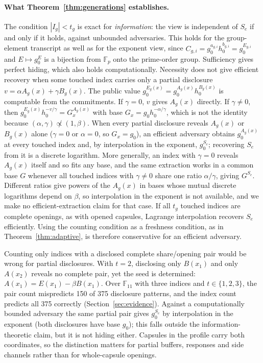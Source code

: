 \documentclass[pdflatex,sn-mathphys-num]{sn-jnl}%
\theoremstyle{plain}
\theoremstyle{definition}
\newcommand{\F}{\mathbb{F}}
\begin{document}
\paragraph{What Theorem~\ref{thm:generations} establishes.}
The condition $|I_g|<t_g$ is exact for \emph{information}: the view is independent of $S_e$ if and only if it holds, against unbounded adversaries. This holds for the group-element transcript as well as for the exponent view, since $C_{g,i}=g_0^{a_{g,i}}h_0^{b_{g,i}}=g_0^{E_{g,i}}$ and $E\mapsto g_0^E$ is a bijection from $\F_p$ onto the prime-order group. Sufficiency gives perfect hiding, which also holds computationally. Necessity does not give efficient recovery when some touched index carries only a partial disclosure $v=\alpha A_g(x)+\gamma B_g(x)$. The public value $g_0^{E_g(x)}=g_0^{A_g(x)}h_0^{B_g(x)}$ is computable from the commitments. If $\gamma=0$, $v$ gives $A_g(x)$ directly. If $\gamma\ne0$, then $g_0^{E_g(x)}h_0^{-v/\gamma}=G_x^{A_g(x)}$ with base $G_x=g_0h_0^{-\alpha/\gamma}$, which is not the identity because $(\alpha,\gamma)\not\propto(1,\beta)$. When every partial disclosure reveals $A_g(x)$ or $B_g(x)$ alone ($\gamma=0$ or $\alpha=0$, so $G_x=g_0$), an efficient adversary obtains $g_0^{A_g(x)}$ at every touched index and, by interpolation in the exponent, $g_0^{S_e}$; recovering $S_e$ from it is a discrete logarithm. More generally, an index with $\gamma=0$ reveals $A_g(x)$ itself and so fits any base, and the same extraction works in a common base $G$ whenever all touched indices with $\gamma\ne0$ share one ratio $\alpha/\gamma$, giving $G^{S_e}$. Different ratios give powers of the $A_g(x)$ in bases whose mutual discrete logarithms depend on $\beta$, so interpolation in the exponent is not available, and we make no efficient-extraction claim for that case. If all $t_g$ touched indices are complete openings, as with opened capsules, Lagrange interpolation recovers $S_e$ efficiently. Using the counting condition as a freshness condition, as in Theorem~\ref{thm:adaptive}, is therefore conservative for an efficient adversary.

Counting only indices with a disclosed complete share/opening pair would be wrong for partial disclosures. With $t=2$, disclosing only $B(x_1)$ and only $A(x_2)$ reveals no complete pair, yet the seed is determined: $A(x_1)=E(x_1)-\beta B(x_1)$. Over $\F_{11}$ with three indices and $t\in\{1,2,3\}$, the pair count mispredicts 150 of 375 disclosure patterns, and the index count predicts all 375 correctly (Section~\ref{sec:evidence}). Against a computationally bounded adversary the same partial pair gives $g_0^{S_e}$ by interpolation in the exponent (both disclosures have base $g_0$); this falls outside the information-theoretic claim, but it is not hiding either. Capsules in the profile carry both coordinates, so the distinction matters for partial buffers, responses and side channels rather than for whole-capsule openings.
\end{document}
